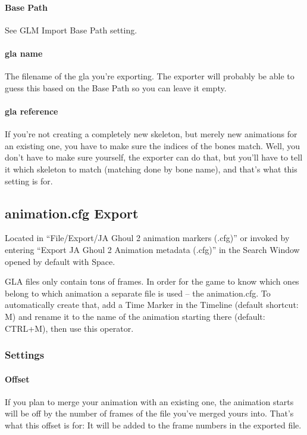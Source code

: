 \documentclass[a4paper,10pt]{article}
\begin{document}
 \paragraph*{Base Path}
 See GLM Import Base Path setting.
 
 \paragraph*{gla name}
 The filename of the gla you're exporting. The exporter will probably be able to guess this based on the
 Base Path so you can leave it empty.
 
 \paragraph*{gla reference}
 If you're not creating a completely new skeleton, but merely new animations for an existing one, you have
 to make sure the indices of the bones match. Well, you don't have to make sure yourself, the exporter can
 do that, but you'll have to tell it which skeleton to match (matching done by bone name), and that's what
 this setting is for.
 
 
 \subsection{animation.cfg Export}
 
 Located in ``File/Export/JA Ghoul 2 animation markers (.cfg)'' or invoked by entering ``Export JA Ghoul 2 
 Animation metadata (.cfg)'' in the Search Window opened by default with Space.
 
 GLA files only contain tons of frames. In order for the game to know which ones belong to which animation
 a separate file is used -- the animation.cfg. To automatically create that, add a Time Marker in the Timeline
 (default shortcut: M) and rename it to the name of the animation starting there (default: CTRL+M), then
 use this operator.
 
 \subsubsection*{Settings}
 
 \paragraph*{Offset}
 If you plan to merge your animation with an existing one, the animation starts will be off by the number of
 frames of the file you've merged yours into. That's what this offset is for: It will be added to the frame
 numbers in the exported file.
 
 
\end{document}
